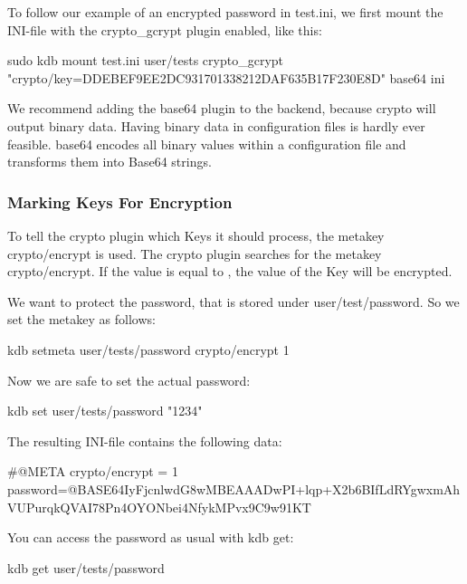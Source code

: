 To follow our example of an encrypted password in {\ttfamily test.\+ini}, we first mount the I\+N\+I-\/file with the {\ttfamily crypto\+\_\+gcrypt} plugin enabled, like this\+:


\begin{DoxyCode}
sudo kdb mount test.ini user/tests crypto\_gcrypt "crypto/key=DDEBEF9EE2DC931701338212DAF635B17F230E8D"
       base64 ini
\end{DoxyCode}


We recommend adding the {\ttfamily base64} plugin to the backend, because {\ttfamily crypto} will output binary data. Having binary data in configuration files is hardly ever feasible. {\ttfamily base64} encodes all binary values within a configuration file and transforms them into Base64 strings.

\subsubsection*{Marking Keys For Encryption}

To tell the {\ttfamily crypto} plugin which Keys it should process, the metakey {\ttfamily crypto/encrypt} is used. The {\ttfamily crypto} plugin searches for the metakey {\ttfamily crypto/encrypt}. If the value is equal to {}, the value of the Key will be encrypted.

We want to protect the password, that is stored under {\ttfamily user/test/password}. So we set the metakey as follows\+:


\begin{DoxyCode}
kdb setmeta user/tests/password crypto/encrypt 1
\end{DoxyCode}


Now we are safe to set the actual password\+:


\begin{DoxyCode}
kdb set user/tests/password "1234"
\end{DoxyCode}


The resulting I\+N\+I-\/file contains the following data\+:


\begin{DoxyCode}
#@META crypto/encrypt = 1
password=@BASE64IyFjcnlwdG8wMBEAAADwPI+lqp+X2b6BIfLdRYgwxmAhVUPurqkQVAI78Pn4OYONbei4NfykMPvx9C9w91KT
\end{DoxyCode}


You can access the password as usual with {\ttfamily kdb get}\+:


\begin{DoxyCode}
kdb get user/tests/password
\end{DoxyCode}


